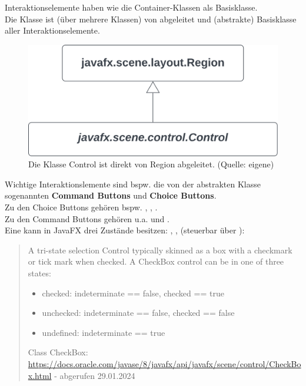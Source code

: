 Interaktionselemente haben wie die Container-Klassen  als Basisklasse.\\

\noindent
Die Klasse  ist (über mehrere Klassen) von  abgeleitet und (abstrakte) Basisklasse aller Interaktionselemente.

\begin{figure}
    \centering
    \includegraphics[scale=0.5]{chapters/fopt3/img/javafx/control}
    \caption{Die Klasse Control ist direkt von Region abgeleitet. (Quelle: eigene)}
    \label{fig:control}
\end{figure}



\noindent
Wichtige Interaktionslemente sind bspw. die von der abstrakten Klasse  sogenannten \textbf{Command Buttons} und \textbf{Choice Buttons}.\\
Zu den Choice Buttons gehören bspw. , , .\\
Zu den Command Buttons gehören u.a.  und .\\

\noindent
Eine  kann in JavaFX drei Zustände besitzen: , ,  (steuerbar über ):

\blockquote[{Class CheckBox: \url{https://docs.oracle.com/javase/8/javafx/api/javafx/scene/control/CheckBox.html} - abgerufen 29.01.2024}]{
    A tri-state selection Control typically skinned as a box with a checkmark or tick mark when checked. A CheckBox control can be in one of three states:
    \begin{itemize}
        \item checked: indeterminate == false, checked == true
        \item unchecked: indeterminate == false, checked == false
        \item undefined: indeterminate == true
    \end{itemize}
}

